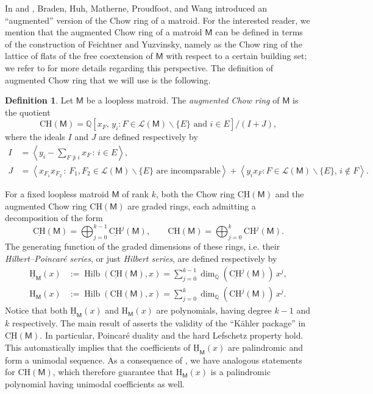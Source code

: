 \documentclass[11pt, a4paper, english]{amsart}
\theoremstyle{teoremas}
\theoremstyle{definition}
\newtheorem{definition}[theorem]{Definition}
\newcommand{\M}{\mathsf{M}}
\newcommand{\Hilb}{\operatorname{Hilb}}
\renewcommand{\H}{\mathrm{H}}
\newcommand{\CH}{\mathrm{CH}}
\newcommand{\uH}{\underline{\mathrm{H}}}
\newcommand{\uCH}{\underline{\mathrm{CH}}}
\begin{document}
In \cite{semismall} and \cite{braden-huh-matherne-proudfoot-wang}, Braden, Huh, Matherne, Proudfoot, and Wang introduced an ``augmented'' version of the Chow ring of a matroid. 
For the interested reader, we mention that the augmented Chow ring of a matroid $\M$ can be defined in terms of the construction of Feichtner and Yuzvinsky, namely as the Chow ring of the lattice of flats of the free coextension of $\M$ with respect to a certain building set; we refer to \cite[Lemma 5.14]{stellahedral} for more details regarding this perspective. The definition of augmented Chow ring that we will use is the following.

\begin{definition}
     Let $\M$ be a loopless matroid. The \textit{augmented Chow ring} of $\M$ is the quotient
        \[
        \CH(\M) = \mathbb{Q}[x_F,\, y_i : F\in\mathcal{L}(\M)\smallsetminus\{E\} \text{ and } i\in E]/{(I+J)},
        \]
    where the ideals $I$ and $J$ are defined respectively by
    \begin{align*}
        I &= \left< y_i - \sum_{F\notni i} x_F \,:\, i\in E\right>,\\
        J &= \left< x_{F_1} x_{F_2} \,:\, F_1,F_2 \in \mathcal{L}(\M)\smallsetminus\{E\} \text{ are incomparable}\right> + \left< y_i x_F :F\in\mathcal{L}(\M)\smallsetminus\{E\},\, i \notin F\right>.
    \end{align*}
\end{definition}

For a fixed loopless matroid $\M$ of rank $k$, both the Chow ring $\uCH(\M)$ and the augmented Chow ring $\CH(\M)$ are graded rings, each admitting a decomposition of the form
    \begin{equation} \label{eq:grading-chow}
    \uCH(\M) = \bigoplus_{j=0}^{k-1} \uCH^j(\M),\qquad\CH(\M) = \bigoplus_{j=0}^{k} \CH^j(\M).
    \end{equation}
The generating function of the graded dimensions of these rings, i.e. their \textit{Hilbert--Poincar\'e series}, or just \textit{Hilbert series}, are defined respectively by
    \begin{align*} 
    \uH_{\M}(x) &:= \Hilb(\uCH(\M), x) = \sum_{j=0}^{k-1} \dim_{\mathbb{Q}}(\uCH^j(\M)) \, x^j,\\ \H_{\M}(x) &:= \Hilb(\CH(\M), x) = \sum_{j=0}^{k} \dim_{\mathbb{Q}}(\CH^j(\M)) \, x^j.
    \end{align*}
Notice that both $\uH_{\M}(x)$ and $\H_{\M}(x)$ are polynomials, having degree $k-1$ and $k$ respectively. The main result of \cite{adiprasito-huh-katz} asserts the validity of the ``K\"ahler package'' in $\uCH(\M)$. In particular, Poincar\'e duality and the hard Lefschetz property hold. This automatically implies that the coefficients of $\uH_{\M}(x)$ are palindromic and form a unimodal sequence. As a consequence of \cite{semismall}, we have analogous statements for $\CH(\M)$, which therefore guarantee that $\H_{\M}(x)$ is a palindromic polynomial having unimodal coefficients as well.
\end{document}
